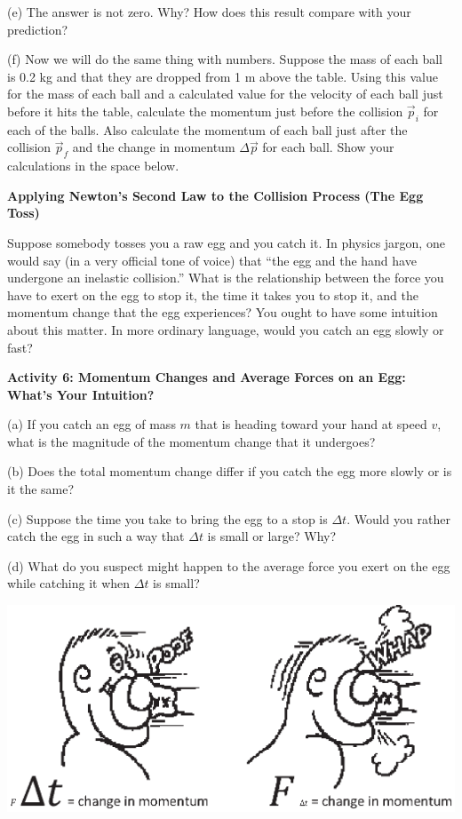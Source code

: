 (e) The answer is not zero. Why? How does this result compare with your 
prediction?
\newpage

(f) Now we will do the same thing with numbers. Suppose the mass of each ball is 0.2 kg and that they are dropped from 1 m above the table. Using this value for the mass of each ball and a calculated value for the velocity of each ball just before it hits the table, 
calculate the momentum just before the collision \( {{\vec p}_{i}} \)
for each of the balls. Also calculate the momentum of each ball just after the
collision \( {{\vec p}_{f}} \) and the change in momentum \( \Delta {\vec p} \)
for each ball. Show your calculations in the space below.
\answerspace{30mm}

\textbf{Applying Newton's Second Law to the Collision Process (The Egg Toss)}

Suppose somebody tosses you a raw egg and you catch it. In physics jargon, one
would say (in a very official tone of voice) that ``the egg and the
hand have undergone an inelastic collision.'' What is the relationship
between the force you have to exert on the egg to stop it, the time it takes
you to stop it, and the momentum change that the egg experiences? You ought
to have some intuition about this matter. In more ordinary language, would you
catch an egg slowly or fast?

\bigskip
\textbf{Activity 6: Momentum Changes and Average Forces on an Egg: What's Your
Intuition?} 

(a) If you catch an egg of mass $m$ that is heading toward your hand at speed
$v$, what is the magnitude of the momentum change that it undergoes?
\answerspace{10mm}

(b) Does the total momentum change differ if you catch the egg more slowly or
is it the same?
\answerspace{10mm}

(c) Suppose the time you take to bring the egg to a stop is \( \Delta  t\).
Would you rather catch the egg in such a way that \( \Delta  t\) is small or
large? Why?
\answerspace{10mm}

(d) What do you suspect might happen to the average force you exert on the egg
while catching it when \( \Delta t \) is small?
\answerspace{20mm}

\pagebreak[2]
\vspace{0.3cm}
{\par\centering \includegraphics{momentum/momentum_fig2_new.eps} \par}
\vspace{0.3cm}

